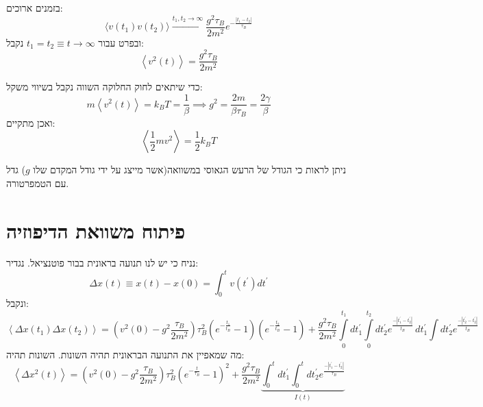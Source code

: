 \documentclass{tstextbook}
\begin{document}
\begin{corollary}
בזמנים ארוכים:
$$\langle v(t_{1})v(t_{2}) \rangle \xrightarrow{t_{1},t_{2}\to \infty}\frac{g^{2}\tau_{B}}{2m^{2}}e^{-\frac{\left|t_{1}-t_{2}\right|}{\tau_{B}}}$$
ובפרט עבור \(t_{1}=t_{2}\equiv t\to \infty\) נקבל:
$$\left\langle v^{2}\left(t\right)\right\rangle=\frac{g^{2}\tau_{B}}{2m^{2}}$$

\end{corollary}
\begin{corollary}
כדי שיתאים לחוק החלוקה השווה נקבל בשיווי משקל:
$$m\left\langle v^{2}\left(t\right)\right\rangle=k_{B}T=\frac{1}{\beta}\implies g^{2}={\frac{2m}{\beta\tau_{B}}}={\frac{2\gamma}{\beta}}$$
ואכן מתקיים:
$$\left\langle{\frac{1}{2}}m v^{2}\right\rangle={\frac{1}{2}}k_{B}T$$

\end{corollary}
\begin{remark}
ניתן לראות כי הגודל של הרעש הגאוסי במשוואה(אשר מייצג על ידי גודל המקדם שלו \(g\)) גדל עם הטמפרטורה.

\end{remark}
\section{פיתוח משוואת הדיפוזיה}

נניח כי יש לנו תנועה בראונית בבור פוטנציאל. נגדיר:
$$\Delta x\left(t\right)\equiv x\left(t\right)-x\left(0\right)=\int_{0}^{t}v\left(t^{\prime}\right)d t^{\prime}$$
ונקבל:
$$\left\langle\Delta x\left(t_{1}\right)\Delta x\left(t_{2}\right)\right\rangle=\left(v^{2}\left(0\right)-g^{2}\frac{\tau_{B}}{2m^{2}}\right)\tau_{B}^{2}\left(e^{-\frac{t_{1}}{t_{B}}}-1\right)\left(e^{-\frac{t_{2}}{t_{B}}}-1\right)+\frac{g^{2}\tau_{B}}{2m^{2}}\int\limits_{0}^{t_{1}}d t_{1}^{\prime}\int\limits_{0}^{t_{2}}d t_{2}^{\prime}e^{\frac{-\left|t_{1}^{\prime}-t_{2}^{\prime}\right|}{t_{B}}}\,d t_{1}^{\prime}\int d t_{2}^{\prime}e^{\frac{-\left|t_{2}^{\prime}-t_{2}^{\prime}\right|}{t_{B}}}$$
מה שמאפיין את התנועה הבראונית תהיה השונות. השונות תהיה:
$$\left\langle\Delta x^{2}\left(t\right)\right\rangle=\left(v^{2}\left(0\right)-g^{2}\frac{\tau_{B}}{2m^{2}}\right)\tau_{B}^{2}\left(e^{-\frac{t}{\tau_{B}}}-1\right)^{2}+\frac{g^{2}\tau_{B}}{2m^{2}}\underset{I(t)}{\underbrace{\int_{0}^{t}d t_{1}^{\prime}\int_{0}^{t}d t_{2}^{\prime}e^{\frac{-\left|t_{1}^{\prime}-t_{2}^{\prime}\right|}{\tau_{B}}}}}$$
\end{document}

